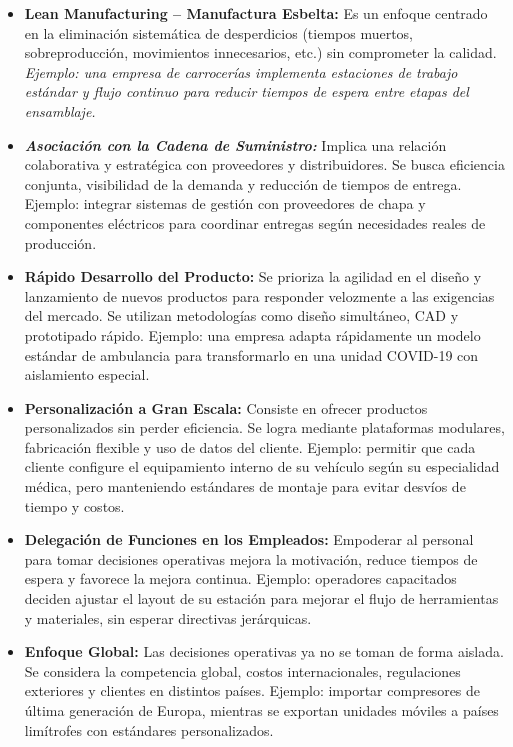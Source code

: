 \documentclass[a4paper,oneside,11pt]{article}
\begin{document}
\begin{itemize}
    \item \textbf{Lean Manufacturing – Manufactura Esbelta:} Es un enfoque centrado en la eliminación sistemática de desperdicios (tiempos muertos, sobreproducción, movimientos innecesarios, etc.) sin comprometer la calidad. \textit{Ejemplo: una empresa de carrocerías implementa estaciones de trabajo estándar y flujo continuo para reducir tiempos de espera entre etapas del ensamblaje. }

    \item \textbf{\textit{Asociación con la Cadena de Suministro:}} Implica una relación colaborativa y estratégica con proveedores y distribuidores. Se busca eficiencia conjunta, visibilidad de la demanda y reducción de tiempos de entrega. Ejemplo: integrar sistemas de gestión con proveedores de chapa y componentes eléctricos para coordinar entregas según necesidades reales de producción.
    \item \textbf{Rápido Desarrollo del Producto:} Se prioriza la agilidad en el diseño y lanzamiento de nuevos productos para responder velozmente a las exigencias del mercado. Se utilizan metodologías como diseño simultáneo, CAD y prototipado rápido. Ejemplo: una empresa adapta rápidamente un modelo estándar de ambulancia para transformarlo en una unidad COVID-19 con aislamiento especial.
    \item \textbf{Personalización a Gran Escala:} Consiste en ofrecer productos personalizados sin perder eficiencia. Se logra mediante plataformas modulares, fabricación flexible y uso de datos del cliente. Ejemplo: permitir que cada cliente configure el equipamiento interno de su vehículo según su especialidad médica, pero manteniendo estándares de montaje para evitar desvíos de tiempo y costos.
    \item \textbf{Delegación de Funciones en los Empleados:} Empoderar al personal para tomar decisiones operativas mejora la motivación, reduce tiempos de espera y favorece la mejora continua. Ejemplo: operadores capacitados deciden ajustar el layout de su estación para mejorar el flujo de herramientas y materiales, sin esperar directivas jerárquicas.

    \item \textbf{Enfoque Global:} Las decisiones operativas ya no se toman de forma aislada. Se considera la competencia global, costos internacionales, regulaciones exteriores y clientes en distintos países. Ejemplo: importar compresores de última generación de Europa, mientras se exportan unidades móviles a países limítrofes con estándares personalizados.
\end{itemize}
\end{document}
